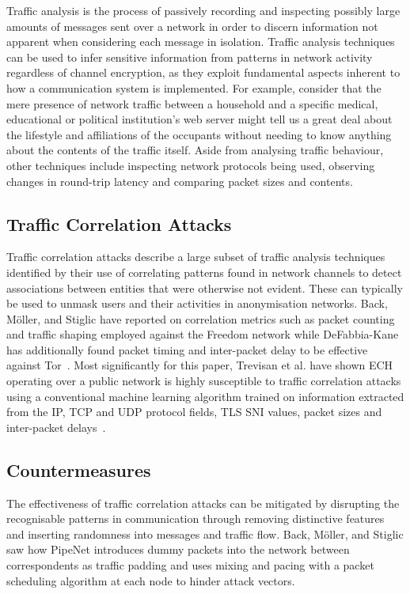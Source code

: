 Traffic analysis is the process of passively recording and inspecting possibly large amounts of messages sent over a network in order to discern information not apparent when considering each message in isolation. Traffic analysis techniques can be used to infer sensitive information from patterns in network activity regardless of channel encryption, as they exploit fundamental aspects inherent to how a communication system is implemented. For example, consider that the mere presence of network traffic between a household and a specific medical, educational or political institution's web server might tell us a great deal about the lifestyle and affiliations of the occupants without needing to know anything about the contents of the traffic itself. Aside from analysing traffic behaviour, other techniques include inspecting network protocols being used, observing changes in round-trip latency and comparing packet sizes and contents.

\subsection{Traffic Correlation Attacks}\label{traffic-correlation-attacks}

Traffic correlation attacks describe a large subset of traffic analysis techniques identified by their use of correlating patterns found in network channels to detect associations between entities that were otherwise not evident. These can typically be used to unmask users and their activities in anonymisation networks. Back, Möller, and Stiglic have reported on correlation metrics such as packet counting and traffic shaping employed against the Freedom network while DeFabbia-Kane has additionally found packet timing and inter-packet delay to be effective against Tor~\cite{back2001traffic, defabbia2011analyzing}. Most significantly for this paper, Trevisan et al. have shown ECH operating over a public network is highly susceptible to traffic correlation attacks using a conventional machine learning algorithm trained on information extracted from the IP, TCP and UDP protocol fields, TLS SNI values, packet sizes and inter-packet delays~\cite{trevisan2023attacking}.

\subsection{Countermeasures}

The effectiveness of traffic correlation attacks can be mitigated by disrupting the recognisable patterns in communication through removing distinctive features and inserting randomness into messages and traffic flow. Back, Möller, and Stiglic saw how PipeNet introduces dummy packets into the network between correspondents as traffic padding and uses mixing and pacing with a packet scheduling algorithm at each node to hinder attack vectors.

